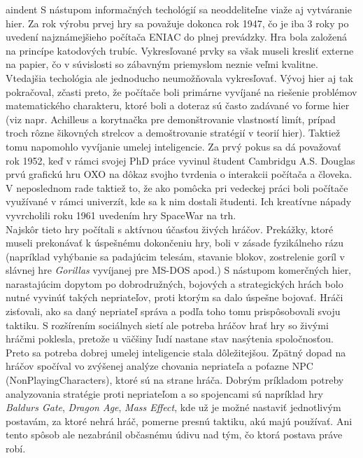 aindent S nástupom informačných techológií sa neoddeliteľne viaže aj vytváranie hier. Za rok výrobu prvej hry sa považuje dokonca rok 1947, čo je iba 3 roky po uvedení najznámejšieho počítača ENIAC do plnej prevádzky\cite{historia}. Hra bola založená na princípe katodových trubíc. Vykresľované prvky sa  však museli kresliť externe na papier, čo v súvislosti so zábavným priemyslom neznie veľmi kvalitne. Vtedajšia techológia ale jednoducho neumožňovala vykresľovať. Vývoj hier aj tak pokračoval, zčasti preto, že počítače boli primárne vyvíjané na riešenie problémov matematického charakteru, ktoré boli a doteraz sú často zadávané vo forme hier (viz napr. Achilleus a korytnačka pre demonštrovanie vlastností limít, prípad troch rôzne šikovných strelcov a demoštrovanie stratégií v teorií hier). Taktiež tomu napomohlo vyvíjanie umelej inteligencie. Za prvý pokus sa dá považovať rok 1952, keď v rámci svojej PhD práce vyvinul študent Cambridgu A.S. Douglas prvú grafickú hru OXO na dôkaz svojho tvrdenia o interakcii počítača a človeka. V neposlednom rade taktiež to, že ako pomôcka pri vedeckej práci boli počítače využívané v rámci univerzít, kde sa k nim dostali študenti. Ich kreatívne nápady vyvrcholili roku 1961 uvedením hry SpaceWar na trh. \\
\indent Najskôr tieto hry počítali s aktívnou účasťou živých hráčov. Prekážky, ktoré museli prekonávať k úspešnému dokončeniu hry, boli v zásade fyzikálneho rázu (napríklad vyhýbanie sa padajúcim telesám, stavanie blokov, zostrelenie goríl v slávnej hre \emph{Gorillas} vyvíjanej pre MS-DOS apod.) S nástupom komerčných hier, narastajúcim dopytom po dobrodružných, bojových a strategických hrách bolo nutné vyvinúť takých nepriateľov, proti ktorým sa dalo úspešne bojovať. Hráči zisťovali, ako sa daný nepriateľ správa a podľa toho tomu prispôsobovali svoju taktiku. S rozšírením sociálnych sietí ale potreba hráčov hrať hry so živými hráčmi poklesla, pretože u väčšiny ľudí nastane stav nasýtenia spoločnosťou. Preto sa potreba dobrej umelej inteligencie stala dôležitejšou. Zpätný dopad na hráčov spočíval vo zvýšenej analýze chovania nepriateľa a poťazne NPC (NonPlayingCharacters), ktoré sú na strane hráča. Dobrým príkladom potreby analyzovania stratégie proti nepriateľom a so spojencami sú napríklad hry \emph{Baldurs Gate\cite{bioware}}, \emph{Dragon Age\cite{bioware}}, \emph{Mass Effect\cite{bioware}}, kde už je možné nastaviť jednotlivým postavám, za ktoré nehrá hráč, pomerne presnú taktiku, akú majú používať. Ani tento spôsob ale nezabránil občasnému údivu nad tým, čo ktorá postava práve robí. \\
